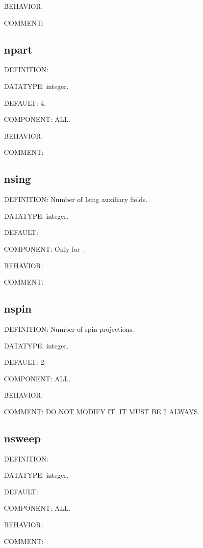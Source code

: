 {\color{purple}BEHAVIOR:}

{\color{olive}COMMENT:}

\subsection{npart}
{\color{red}DEFINITION:}

{\color{green}DATATYPE:} integer.

{\color{blue}DEFAULT:} 4.

{\color{brown}COMPONENT:} ALL.

{\color{purple}BEHAVIOR:}

{\color{olive}COMMENT:}

\subsection{nsing}
{\color{red}DEFINITION:} Number of Ising auxiliary fields.

{\color{green}DATATYPE:} integer.

{\color{blue}DEFAULT:}

{\color{brown}COMPONENT:} Only for {\daisy}.

{\color{purple}BEHAVIOR:}

{\color{olive}COMMENT:}

\subsection{nspin}
{\color{red}DEFINITION:} Number of spin projections.

{\color{green}DATATYPE:} integer.

{\color{blue}DEFAULT:} 2.

{\color{brown}COMPONENT:} ALL.

{\color{purple}BEHAVIOR:}

{\color{olive}COMMENT:} DO NOT MODIFY IT. IT MUST BE 2 ALWAYS.

\subsection{nsweep}
{\color{red}DEFINITION:}

{\color{green}DATATYPE:} integer.

{\color{blue}DEFAULT:}

{\color{brown}COMPONENT:} ALL.

{\color{purple}BEHAVIOR:}

{\color{olive}COMMENT:}

